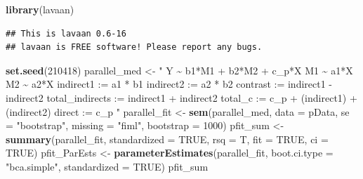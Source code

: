\documentclass[
  11pt,
]{book}
\newenvironment{Shaded}{\begin{snugshade}}{\end{snugshade}}
\newcommand{\AttributeTok}[1]{\textcolor[rgb]{0.27,0.27,0.27}{#1}}
\newcommand{\ConstantTok}[1]{\textcolor[rgb]{0.37,0.37,0.37}{#1}}
\newcommand{\DecValTok}[1]{\textcolor[rgb]{0.06,0.06,0.06}{#1}}
\newcommand{\FunctionTok}[1]{\textcolor[rgb]{0.27,0.27,0.27}{\textbf{#1}}}
\newcommand{\NormalTok}[1]{#1}
\newcommand{\OtherTok}[1]{\textcolor[rgb]{0.37,0.37,0.37}{#1}}
\newcommand{\StringTok}[1]{\textcolor[rgb]{0.5,0.5,0.5}{#1}}
\begin{document}
\begin{Shaded}
\begin{Highlighting}[]
\FunctionTok{library}\NormalTok{(lavaan)}
\end{Highlighting}
\end{Shaded}

\begin{verbatim}
## This is lavaan 0.6-16
## lavaan is FREE software! Please report any bugs.
\end{verbatim}

\begin{Shaded}
\begin{Highlighting}[]
\FunctionTok{set.seed}\NormalTok{(}\DecValTok{210418}\NormalTok{)}
\NormalTok{parallel\_med }\OtherTok{\textless{}{-}} \StringTok{"}
\StringTok{    Y \textasciitilde{} b1*M1 + b2*M2 + c\_p*X}
\StringTok{    M1 \textasciitilde{} a1*X}
\StringTok{    M2 \textasciitilde{} a2*X}
\StringTok{    indirect1 := a1 * b1}
\StringTok{    indirect2 := a2 * b2}
\StringTok{    contrast := indirect1 {-} indirect2}
\StringTok{    total\_indirects := indirect1 + indirect2}
\StringTok{    total\_c    := c\_p + (indirect1) + (indirect2)}
\StringTok{    direct := c\_p}
\StringTok{ "}
\NormalTok{parallel\_fit }\OtherTok{\textless{}{-}} \FunctionTok{sem}\NormalTok{(parallel\_med, }\AttributeTok{data =}\NormalTok{ pData, }\AttributeTok{se =} \StringTok{"bootstrap"}\NormalTok{, }\AttributeTok{missing =} \StringTok{"fiml"}\NormalTok{,}
    \AttributeTok{bootstrap =} \DecValTok{1000}\NormalTok{)}
\NormalTok{pfit\_sum }\OtherTok{\textless{}{-}} \FunctionTok{summary}\NormalTok{(parallel\_fit, }\AttributeTok{standardized =} \ConstantTok{TRUE}\NormalTok{, }\AttributeTok{rsq =}\NormalTok{ T, }\AttributeTok{fit =} \ConstantTok{TRUE}\NormalTok{,}
    \AttributeTok{ci =} \ConstantTok{TRUE}\NormalTok{)}
\NormalTok{pfit\_ParEsts }\OtherTok{\textless{}{-}} \FunctionTok{parameterEstimates}\NormalTok{(parallel\_fit, }\AttributeTok{boot.ci.type =} \StringTok{"bca.simple"}\NormalTok{,}
    \AttributeTok{standardized =} \ConstantTok{TRUE}\NormalTok{)}
\NormalTok{pfit\_sum}
\end{Highlighting}
\end{Shaded}
\end{document}
